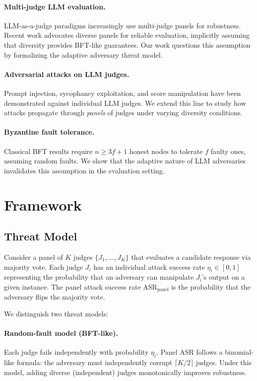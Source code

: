 \documentclass[11pt]{article}
\begin{document}
\paragraph{Multi-judge LLM evaluation.}
LLM-as-a-judge paradigms \cite{zheng2024judging} increasingly use multi-judge panels for robustness.
Recent work advocates diverse panels for reliable evaluation, implicitly assuming that diversity provides BFT-like guarantees.
Our work questions this assumption by formalizing the adaptive adversary threat model.

\paragraph{Adversarial attacks on LLM judges.}
Prompt injection, sycophancy exploitation, and score manipulation have been demonstrated against individual LLM judges.
We extend this line to study how attacks propagate through \emph{panels} of judges under varying diversity conditions.

\paragraph{Byzantine fault tolerance.}
Classical BFT results require $n \geq 3f+1$ honest nodes to tolerate $f$ faulty ones, assuming random faults.
We show that the adaptive nature of LLM adversaries invalidates this assumption in the evaluation setting.

\section{Framework}
\label{sec:framework}

\subsection{Threat Model}

Consider a panel of $K$ judges $\{J_1, \ldots, J_K\}$ that evaluates a candidate response via majority vote.
Each judge $J_i$ has an individual attack success rate $\eta_i \in [0,1]$ representing the probability that an adversary can manipulate $J_i$'s output on a given instance.
The panel attack success rate $\text{ASR}_{\text{panel}}$ is the probability that the adversary flips the majority vote.

We distinguish two threat models:

\paragraph{Random-fault model (BFT-like).}
Each judge fails independently with probability $\eta_i$.
Panel ASR follows a binomial-like formula: the adversary must independently corrupt $\lceil K/2 \rceil$ judges.
Under this model, adding diverse (independent) judges monotonically improves robustness.
\end{document}
